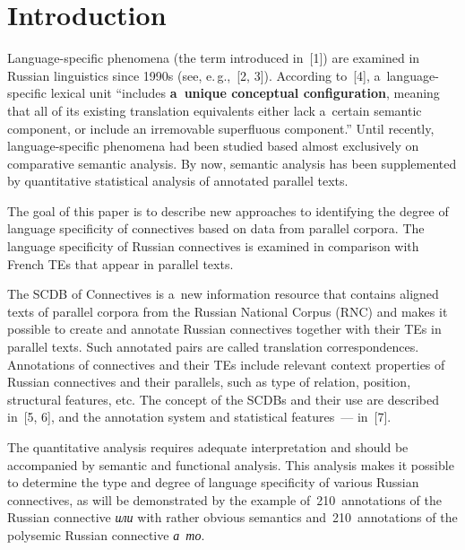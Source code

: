       \begin{multicols}{2}

                  \label{st\stat}
  
  \section{Introduction}
  
  \noindent
  Language-specific phenomena (the term introduced in~[1]) are examined in 
Russian linguistics since 1990s (see, e.\,g.,~[2, 3]). According to~[4],  
a~language-specific lexical unit ``includes \textbf{a~unique conceptual 
configuration}, meaning that all of its existing translation equivalents either lack 
a~certain semantic component, or include an irremovable superfluous component.'' 
Until recently, language-specific phenomena had been studied based almost 
exclusively on comparative semantic analysis. By now, semantic analysis has been 
supplemented by quantitative statistical analysis of annotated parallel texts. 
  
  The goal of this paper is to describe new approaches to identifying the degree of 
language specificity of connectives based on data from parallel corpora. The 
language specificity of Russian connectives is examined in comparison with French 
TEs that appear in parallel texts. 
  
  The SCDB of Connectives is a~new information resource that contains aligned 
texts of parallel corpora from the Russian National Corpus (RNC) and makes it 
possible to create and annotate Russian connectives together with their 
TEs in parallel texts. Such annotated pairs are called translation 
correspondences. Annotations of connectives and their TEs include relevant 
context properties of Russian connectives and their parallels, such as type of relation, 
position, structural features, etc. The concept of the SCDBs and their use are 
described in~[5, 6], and the annotation system and statistical features~--- in~[7]. 
  
  The quantitative analysis requires adequate interpretation and should be 
accompanied by semantic and functional analysis. This analysis makes it possible to 
determine the type and degree of language specificity of various Russian connectives, 
as will be demonstrated by the example of~210~annotations of the Russian 
connective \textit{или} with rather obvious semantics and~210~annotations of the 
polysemic Russian connective \textit{а~то}.

\vspace*{-4pt}
  

\end{multicols}
